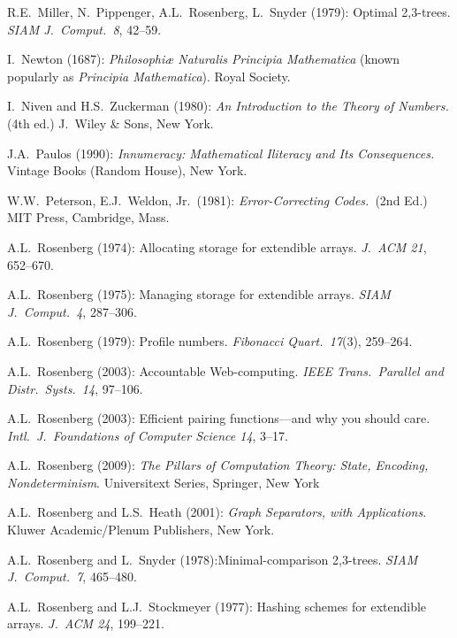 \begin{thebibliography}{999}

R.E.~Miller, N.~Pippenger, A.L.~Rosenberg, L.~Snyder (1979): Optimal
2,3-trees.  {\it SIAM J.~Comput.~8}, 42--59.



I.~Newton (1687): {\it Philosophiæ Naturalis Principia Mathematica}
(known popularly as {\it Principia Mathematica}).
Royal Society.


I.~Niven and H.S.~Zuckerman (1980):
{\it An Introduction to the Theory of Numbers.} (4th ed.)
J.~Wiley \& Sons, New York.



J.A.~Paulos (1990):
{\it Innumeracy: Mathematical Iliteracy and Its Consequences.}
Vintage Books (Random House), New York.

W.W.~Peterson, E.J.~Weldon, Jr.~(1981):
{\it Error-Correcting Codes.}~(2nd Ed.)
MIT Press, Cambridge, Mass.



A.L.~Rosenberg (1974): Allocating storage for extendible arrays.  {\it
J.~ACM 21}, 652--670.

A.L.~Rosenberg (1975): Managing storage for extendible arrays.  {\it
SIAM J.~Comput.~4}, 287--306.

A.L.~Rosenberg (1979): Profile numbers.  {\it Fibonacci Quart.~17}(3),
259--264.

A.L.~Rosenberg (2003): Accountable Web-computing.  {\it IEEE
Trans.~Parallel and Distr.~Systs.~14}, 97--106.

A.L.~Rosenberg (2003): Efficient pairing functions---and why you
should care.  {\it Intl.~J.~Foundations of Computer Science 14},
3--17.

A.L.~Rosenberg (2009):
{\it The Pillars of Computation Theory: State, Encoding,
  Nondeterminism}.
Universitext Series, Springer, New York 

A.L.~Rosenberg and L.S.~Heath (2001):
{\it Graph Separators, with Applications}.
Kluwer Academic/Plenum Publishers, New York.

A.L.~Rosenberg and L.~Snyder (1978):Minimal-comparison 2,3-trees.
{\it SIAM J.~Comput.~7}, 465--480.


A.L.~Rosenberg and L.J.~Stockmeyer (1977): Hashing schemes for
extendible arrays.  {\it J.~ACM 24}, 199--221.


\end{thebibliography}

